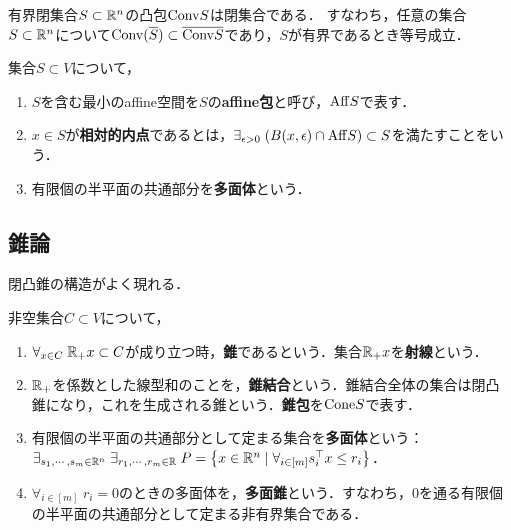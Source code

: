 \documentclass[uplatex,dvipdfmx]{jsreport}
\begin{document}
\begin{theorem}
    有界閉集合$S\subset\mathbb{R}^n$の凸包$\mathrm{Conv} S$は閉集合である．
    すなわち，任意の集合$S\subset\mathbb{R}^n$について$\mathrm{Conv}(\overline{S})\subset\overline{\mathrm{Conv} S}$であり，$S$が有界であるとき等号成立．
\end{theorem}

\begin{definition}
    集合$S\subset V$について，
    \begin{enumerate}
        \item $S$を含む最小のaffine空間を$S$の\textbf{affine包}と呼び，$\mathrm{Aff} S$で表す．
        \item $x\in S$が\textbf{相対的内点}であるとは，$\exists_{\epsilon>0}\;(B(x,\epsilon)\cap\mathrm{Aff} S)\subset S$を満たすことをいう．
        \item 有限個の半平面の共通部分を\textbf{多面体}という．
    \end{enumerate}
\end{definition}

\subsection{錐論}

\begin{tcolorbox}[colframe=ForestGreen, colback=ForestGreen!10!white,breakable,colbacktitle=ForestGreen!40!white,coltitle=black,fonttitle=\bfseries\sffamily,
title=]
    閉凸錐の構造がよく現れる．
\end{tcolorbox}

\begin{definition}
    非空集合$C\subset V$について，
    \begin{enumerate}
        \item $\forall_{x\in C}\;\mathbb{R}_+x\subset C$が成り立つ時，\textbf{錐}であるという．集合$\mathbb{R}_+x$を\textbf{射線}という．
        \item $\mathbb{R}_+$を係数とした線型和のことを，\textbf{錐結合}という．錐結合全体の集合は閉凸錐になり，これを生成される錐という．\textbf{錐包}を$\mathrm{Cone} S$で表す．
        \item 有限個の半平面の共通部分として定まる集合を\textbf{多面体}という：$\exists_{s_1,\cdots,s_m\in\mathbb{R}^n}\;\exists_{r_1,\cdots,r_m\in\mathbb{R}}\;P=\left\{x\in\mathbb{R}^n\mid\forall_{i\in[m]} s_i^\top x\le r_i\right\}$．
        \item $\forall_{i\in[m]}\;r_i=0$のときの多面体を，\textbf{多面錐}という．すなわち，$0$を通る有限個の半平面の共通部分として定まる非有界集合である．
    \end{enumerate}
\end{definition}
\end{document}
